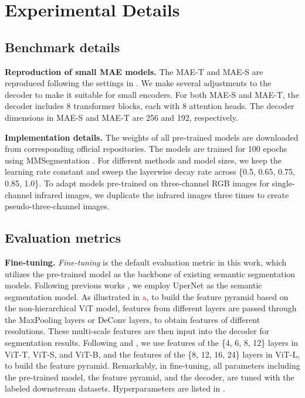 \section{Experimental Details}
\label{app:experimental_details}
\subsection{Benchmark details}
\label{app:benchmark_details}


\textbf{Reproduction of small MAE models.} The MAE-T and MAE-S are reproduced following the settings in \citet{mae}. We make several adjustments to the decoder to make it suitable for small encoders. For both MAE-S and MAE-T, the decoder includes 8 transformer blocks, each with 8 attention heads. The decoder dimensions in MAE-S and MAE-T are 256 and 192, respectively.

\textbf{Implementation details.} The weights of all pre-trained models are downloaded from corresponding official repositories. The models are trained for 100 epochs using MMSegmentation \citep{mmseg}. For different methods and model sizes, we keep the learning rate constant and sweep the layerwise decay rate across \{0.5, 0.65, 0.75, 0.85, 1.0\}. To adapt models pre-trained on three-channel RGB images for single-channel infrared images, we duplicate the infrared images three times to create pseudo-three-channel images.

\subsection{Evaluation metrics}
\label{app:appendix_evaluation}

\textbf{Fine-tuning.} \textit{Fine-tuning} is the default evaluation metric in this work, which utilizes the pre-trained model as the backbone of existing semantic segmentation models. Following previous works \citep{mae, iBOT}, we employ UperNet \citep{upernet} as the semantic segmentation model. As illustrated in \textcolor{red}{a}, to build the feature pyramid based on the non-hierarchical ViT model, features from different layers are passed through the MaxPooling layers or DeConv layers, to obtain features of different resolutions. These multi-scale features are then input into the decoder for segmentation results. Following \citet{mae} and \citet{iBOT}, we use features of the \{4, 6, 8, 12\} layers in ViT-T, ViT-S, and ViT-B, and the features of the \{8, 12, 16, 24\} layers in ViT-L, to build the feature pyramid. Remarkably, in fine-tuning, all parameters including the pre-trained model, the feature pyramid, and the decoder, are tuned with the labeled downstream datasets. Hyperparameters are listed in .

